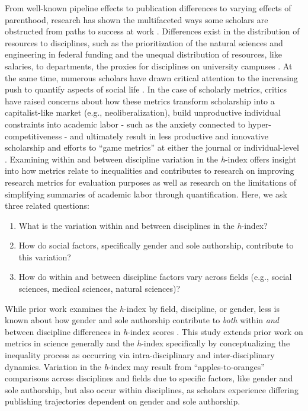 \documentclass[
  10pt,
  letterpaper,
]{article}
\providecommand{\tightlist}{%
  \setlength{\itemsep}{0pt}\setlength{\parskip}{0pt}}\usepackage{longtable,booktabs,array}
\begin{document}
From well-known pipeline effects to publication differences to varying
effects of parenthood, research has shown the multifaceted ways some
scholars are obstructed from paths to success at work
\citep{fox_gender_2005, fox_gender_2017, grant_revisiting_2000, long_scientific_1995, morgan_unequal_2021}.
Differences exist in the distribution of resources to disciplines, such
as the prioritization of the natural sciences and engineering in federal
funding and the unequal distribution of resources, like salaries, to
departments, the proxies for disciplines on university campuses
\citep{katz_metrics_2020}. At the same time, numerous scholars have
drawn critical attention to the increasing push to quantify aspects of
social life \citep{mennicken_what_2019}. In the case of scholarly
metrics, critics have raised concerns about how these metrics transform
scholarship into a capitalist-like market (e.g., neoliberalization),
build unproductive individual constraints into academic labor - such as
the anxiety connected to hyper-competitiveness - and ultimately result
in less productive and innovative scholarship
\citep{edwards_academic_2017, muller_tyranny_2019} and efforts to ``game
metrics'' at either the journal or individual-level
\citep{siler_who_2022}. Examining within and between discipline
variation in the \emph{h}-index offers insight into how metrics relate
to inequalities and contributes to research on improving research
metrics for evaluation purposes as well as research on the limitations
of simplifying summaries of academic labor through quantification. Here,
we ask three related questions:

\begin{enumerate}
\def\labelenumi{\arabic{enumi}.}
\tightlist
\item
  What is the variation within and between disciplines in the
  \emph{h}-index?
\item
  How do social factors, specifically gender and sole authorship,
  contribute to this variation?
\item
  How do within and between discipline factors vary across fields (e.g.,
  social sciences, medical sciences, natural sciences)?
\end{enumerate}

While prior work examines the \emph{h}-index by field, discipline, or
gender, less is known about how gender and sole authorship contribute to
\emph{both} within \emph{and} between discipline differences in
\emph{h}-index scores \citep{bihari_review_2023}. This study extends
prior work on metrics in science generally and the \emph{h}-index
specifically by conceptualizing the inequality process as occurring via
intra-disciplinary and inter-disciplinary dynamics. Variation in the
\emph{h}-index may result from ``apples-to-oranges'' comparisons across
disciplines and fields due to specific factors, like gender and sole
authorship, but also occur within disciplines, as scholars experience
differing publishing trajectories dependent on gender and sole
authorship.
\end{document}
